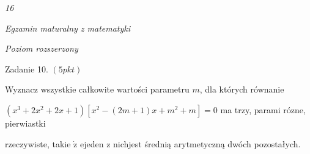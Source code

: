 \documentclass[a4paper,12pt]{article}
\begin{document}
{\it 16}

{\it Egzamin maturalny z matematyki}

{\it Poziom rozszerzony}

Zadanie 10. $(5pkt)$

Wyznacz wszystkie całkowite wartości parametru $m$, dla których równanie

$(x^{3}+2x^{2}+2x+1)[x^{2}-(2m+1)x+m^{2}+m]=0$ ma trzy, parami rózne, pierwiastki

rzeczywiste, takie $\dot{\mathrm{z}}$ ejeden z nichjest średnią arytmetyczną dwóch pozostałych.
\end{document}
